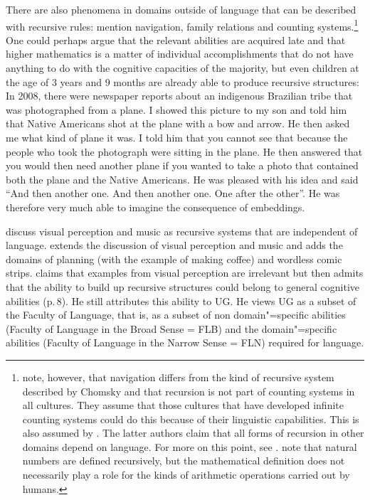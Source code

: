 There are also phenomena in domains outside of language that can be described with recursive rules:
\citet*[]{HCF2002a} mention navigation, family relations and counting systems.\footnote{\label{fn-Rekursion-Mathematik}%
  \citet[]{PJ2005a} note, however, that navigation differs from the kind of recursive system described by Chomsky and that recursion
  is not part of counting systems in all cultures. They assume that those cultures that have developed
  infinite counting systems could do this because of their linguistic capabilities. This is also assumed by \citet*[]{FHC2005a}.
  The latter authors claim that all forms of recursion in other domains depend on language. For more on this point, see
  . \citet{LL2011a} note that natural numbers are defined
  recursively, but the mathematical definition does not necessarily play a role for the kinds of arithmetic operations carried out by humans.
}
\addlines[2]
One could perhaps argue that the relevant abilities are acquired late and that higher mathematics is a matter of individual accomplishments that do not
have anything to do with the cognitive capacities of the majority, but even children at the age of 3
years and 9 months are already able to produce recursive structures:
In 2008, there were newspaper reports about an indigenous Brazilian tribe that was photographed from
a plane. I showed this picture to my son and told him that Native Americans shot at the plane with a bow and arrow. He then asked me what kind of plane it was. I told him that you cannot 
see that because the people
who took the photograph were sitting in the plane. He then answered that you would then need another
plane if you wanted to take a photo that contained both the plane and the Native Americans. He was
pleased with his idea and said ``And then another one. And then another one. One after the
other''. He was therefore very much able to imagine the consequence of embeddings.

\citet[--114]{CJ2005a} discuss visual perception and music as recursive systems that are
independent of language. \citet{Jackendoff2011a} extends the discussion of visual perception and
music and adds the domains of planning (with the example of making coffee) and wordless comic strips.
\citet[--8]{Chomsky2007a} claims that examples from visual perception are irrelevant but then admits that the ability to build up recursive structures
could belong to general cognitive abilities (p.\,8).
He still attributes this ability to UG. He views UG as a subset of the Faculty of Language, that is, as a subset of non domain"=specific abilities
(Faculty of Language in the Broad Sense = FLB) and the domain"=specific abilities (Faculty of Language in the Narrow Sense = FLN) required for language.

